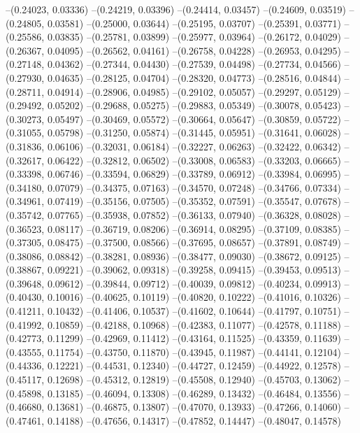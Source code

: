 --(0.24023, 0.03336)
--(0.24219, 0.03396)
--(0.24414, 0.03457)
--(0.24609, 0.03519)
--(0.24805, 0.03581)
--(0.25000, 0.03644)
--(0.25195, 0.03707)
--(0.25391, 0.03771)
--(0.25586, 0.03835)
--(0.25781, 0.03899)
--(0.25977, 0.03964)
--(0.26172, 0.04029)
--(0.26367, 0.04095)
--(0.26562, 0.04161)
--(0.26758, 0.04228)
--(0.26953, 0.04295)
--(0.27148, 0.04362)
--(0.27344, 0.04430)
--(0.27539, 0.04498)
--(0.27734, 0.04566)
--(0.27930, 0.04635)
--(0.28125, 0.04704)
--(0.28320, 0.04773)
--(0.28516, 0.04844)
--(0.28711, 0.04914)
--(0.28906, 0.04985)
--(0.29102, 0.05057)
--(0.29297, 0.05129)
--(0.29492, 0.05202)
--(0.29688, 0.05275)
--(0.29883, 0.05349)
--(0.30078, 0.05423)
--(0.30273, 0.05497)
--(0.30469, 0.05572)
--(0.30664, 0.05647)
--(0.30859, 0.05722)
--(0.31055, 0.05798)
--(0.31250, 0.05874)
--(0.31445, 0.05951)
--(0.31641, 0.06028)
--(0.31836, 0.06106)
--(0.32031, 0.06184)
--(0.32227, 0.06263)
--(0.32422, 0.06342)
--(0.32617, 0.06422)
--(0.32812, 0.06502)
--(0.33008, 0.06583)
--(0.33203, 0.06665)
--(0.33398, 0.06746)
--(0.33594, 0.06829)
--(0.33789, 0.06912)
--(0.33984, 0.06995)
--(0.34180, 0.07079)
--(0.34375, 0.07163)
--(0.34570, 0.07248)
--(0.34766, 0.07334)
--(0.34961, 0.07419)
--(0.35156, 0.07505)
--(0.35352, 0.07591)
--(0.35547, 0.07678)
--(0.35742, 0.07765)
--(0.35938, 0.07852)
--(0.36133, 0.07940)
--(0.36328, 0.08028)
--(0.36523, 0.08117)
--(0.36719, 0.08206)
--(0.36914, 0.08295)
--(0.37109, 0.08385)
--(0.37305, 0.08475)
--(0.37500, 0.08566)
--(0.37695, 0.08657)
--(0.37891, 0.08749)
--(0.38086, 0.08842)
--(0.38281, 0.08936)
--(0.38477, 0.09030)
--(0.38672, 0.09125)
--(0.38867, 0.09221)
--(0.39062, 0.09318)
--(0.39258, 0.09415)
--(0.39453, 0.09513)
--(0.39648, 0.09612)
--(0.39844, 0.09712)
--(0.40039, 0.09812)
--(0.40234, 0.09913)
--(0.40430, 0.10016)
--(0.40625, 0.10119)
--(0.40820, 0.10222)
--(0.41016, 0.10326)
--(0.41211, 0.10432)
--(0.41406, 0.10537)
--(0.41602, 0.10644)
--(0.41797, 0.10751)
--(0.41992, 0.10859)
--(0.42188, 0.10968)
--(0.42383, 0.11077)
--(0.42578, 0.11188)
--(0.42773, 0.11299)
--(0.42969, 0.11412)
--(0.43164, 0.11525)
--(0.43359, 0.11639)
--(0.43555, 0.11754)
--(0.43750, 0.11870)
--(0.43945, 0.11987)
--(0.44141, 0.12104)
--(0.44336, 0.12221)
--(0.44531, 0.12340)
--(0.44727, 0.12459)
--(0.44922, 0.12578)
--(0.45117, 0.12698)
--(0.45312, 0.12819)
--(0.45508, 0.12940)
--(0.45703, 0.13062)
--(0.45898, 0.13185)
--(0.46094, 0.13308)
--(0.46289, 0.13432)
--(0.46484, 0.13556)
--(0.46680, 0.13681)
--(0.46875, 0.13807)
--(0.47070, 0.13933)
--(0.47266, 0.14060)
--(0.47461, 0.14188)
--(0.47656, 0.14317)
--(0.47852, 0.14447)
--(0.48047, 0.14578)

